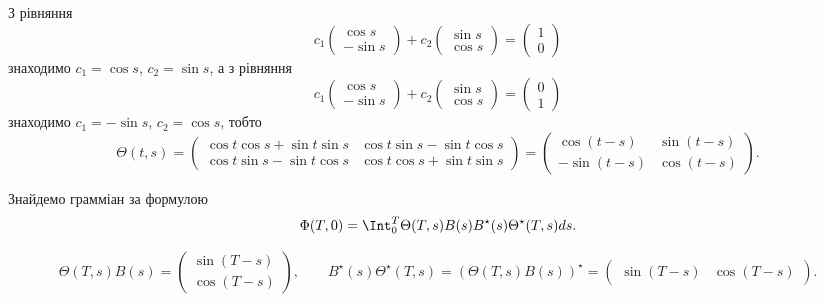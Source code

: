 \begin{solution}
    З рівняння
    \[c_1 \begin{pmatrix} \cos s \\ - \sin s \end{pmatrix} + c_2 \begin{pmatrix} \sin s \\ \cos s \end{pmatrix} = \begin{pmatrix} 1 \\ 0 \end{pmatrix} \]
    знаходимо $c_1 = \cos s$, $c_2 = \sin s$, а з рівняння
    \[c_1 \begin{pmatrix} \cos s \\ - \sin s \end{pmatrix} + c_2 \begin{pmatrix} \sin s \\ \cos s \end{pmatrix} = \begin{pmatrix}  0\\ 1 \end{pmatrix} \]
    знаходимо $c_1 = -\sin s$, $c_2 = \cos s$, тобто
    \[ \Theta(t, s) = \begin{pmatrix} \cos t\cos s + \sin t\sin s & \cos t\sin s - \sin t\cos s \\ \cos t\sin s - \sin t\cos s & \cos t\cos s + \sin t\sin s \end{pmatrix} = \begin{pmatrix} \cos(t - s) & \sin(t - s) \\ -\sin(t - s) & \cos(t - s) \end{pmatrix}. \]
    
    Знайдемо грамміан за формулою \[\Phi(T, 0) = \Int_0^T \Theta(T, s) B(s) B^\star (s) \Theta^\star(T, s) ds. \]
    
    \[ \Theta(T, s) B(s) = \begin{pmatrix}  \sin(T - s) \\ \cos(T - s) \end{pmatrix}, \qquad B^\star (s) \Theta^\star(T, s)  =  (\Theta(T, s) B(s))^\star = \begin{pmatrix} \sin(T - s) & \cos(T - s) \end{pmatrix}. \]
    

\end{solution}
